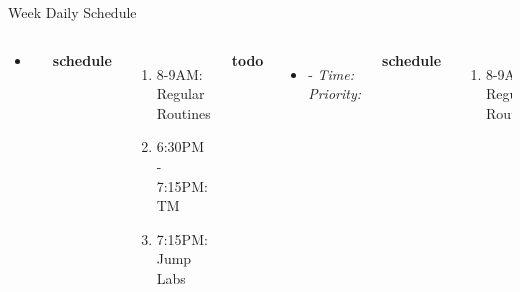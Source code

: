 \documentclass[serif, mathserif, final]{beamer}
\newcommand{\timeEst}[1]{\textit{Time:} \textit{#1}}
\newcommand{\priority}[1]{\textit{Priority:} \textit{#1}}
\newcommand{\deadline}[1]{#1}
\newcommand{\dl}[1]{#1}
\begin{document}
\begin{frame}{}
\begin{columns}
\begin{column}{0.50\linewidth}
\begin{block}{Week Daily Schedule}
\begin{columns}
\begin{itemize}
    \tiny \item \tiny 
  \end{itemize}
  \textbf{\small schedule}\\
  \begin{enumerate} 
    \tiny \item \tiny 8-9AM: Regular Routines 
    \tiny \item 6:30PM - 7:15PM: TM 
    \tiny \item 7:15PM: Jump Labs 
  \end{enumerate} 
  
  \textbf{\small todo}\\ 
  \begin{itemize}
    \tiny \item \tiny -  \deadline{ }   \timeEst{}  \priority{} 
  \end{itemize}
  \textbf{\small schedule}\\
  \begin{enumerate}
    \tiny \item \tiny 8-9AM: Regular Routines 
  \end{enumerate}
  
  \textbf{\small todo}\\
  \begin{itemize}
    \tiny \item \tiny Work: finish writing slides 
  \item \tiny Work: comm: have Atul send pics  

  \item \tiny worklife: finish writing the comm + worklife: finish tm
    org \dl{wed} 
  \item \tiny Work: comm: finish writing to Bronish \dl{WedOrnextWed} 
  \item \tiny MGmt: Time: do planning draft for summer

  \end{itemize}
  \textbf{\small schedule}\\ 
  \begin{enumerate}
    \tiny \item \tiny 8-9AM: Regular Routines 
  \end{enumerate}
  
  \textbf{\small todo}\\
  \begin{itemize}
  \item \tiny 
  \item \tiny 
    

\end{itemize}
\end{columns}
\end{block}
\end{column}
\end{columns}
\end{frame}
\end{document}
